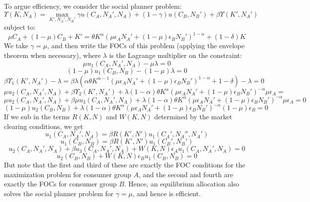 \documentclass[10pt,letter]{article}
\begin{document}
To argue efficiency, we consider the social planner problem:
\[ \Upsilon(K, N_A) = \max_{K', N_A', N_B'} \gamma u(C_A, N_A', N_A) + (1-\gamma) u(C_B, N_B') + \beta \Upsilon(K', N_A') \]
subject to:
\[ \mu C_A + (1-\mu)C_B + K' = \theta K^\alpha (\mu \epsilon_A N_A' + (1-\mu)\epsilon_B N_B')^{1-\alpha} + (1-\delta)K \]
We take $\gamma = \mu$, and then write the FOCs of this problem (applying the envelope theorem when necessary), where $\lambda$ is the Lagrange multiplier on the constraint:
\[ \mu u_1(C_A, N_A', N_A) - \mu \lambda = 0 \]
\[ (1-\mu) u_1(C_B, N_B) - (1-\mu) \lambda = 0 \]
\[ \beta \Upsilon_1(K', N_A') - \lambda = \beta \lambda (\alpha \theta K^{\alpha - 1}(\mu \epsilon_A N_A' + (1-\mu)\epsilon_B N_B')^{1-\alpha} + 1 - \delta )  - \lambda = 0 \]
\[ \mu u_2(C_A, N_A', N_A) + \beta \Upsilon_2(K', N_A') + \lambda (1-\alpha)\theta K^\alpha (\mu \epsilon_A N_A' + (1-\mu)\epsilon_B N_B')^{-\alpha}\mu\epsilon_A = \] \[ \mu u_2(C_A, N_A', N_A) + \beta \mu u_3(C_A, N_A', N_A) + \lambda (1-\alpha)\theta K^\alpha (\mu \epsilon_A N_A' + (1-\mu)\epsilon_B N_B')^{-\alpha}\mu\epsilon_A = 0 \]
\[ (1-\mu) u_2(C_B, N_B) + \lambda (1-\alpha)\theta K^\alpha (\mu \epsilon_A N_A' + (1-\mu)\epsilon_B N_B')^{-\alpha}(1-\mu)\epsilon_B = 0  \]
If we sub in the terms $R(K,N)$ and $W(K,N)$ determined by the market clearing conditions, we get
\[ u_1(C_A, N_A', N_A) =  \beta R(K', N') u_1(C_A', N_A'', N_A') \]
\[ u_1(C_B, N_B) =  \beta R(K', N') u_1(C_B', N_B') \]
\[ u_2(C_A, N_A', N_A) + \beta u_3(C_A, N_A', N_A) + W(K, N)\epsilon_A u_1(C_A, N_A', N_A) = 0 \]
\[ u_2(C_B, N_B) + W(K,N)\epsilon_B u_1(C_B, N_B) = 0 \]
But note that the first and third of these are exactly the FOC conditions for the maximization problem for consumer group $A$, and the second and fourth are exactly the FOCs for consumer group $B$. Hence, an equilibrium allocation also solves the social planner problem for $\gamma = \mu$, and hence is efficient. 
\end{document}
